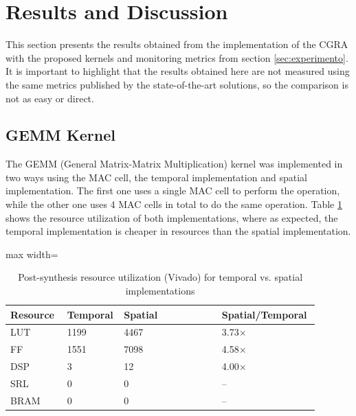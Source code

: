 \documentclass[conference]{IEEEtran}
\begin{document}
\section{Results and Discussion}

This section presents the results obtained from the implementation of the CGRA with the proposed kernels and monitoring metrics from section \ref{sec:experimento}. 
It is important to highlight that the results obtained here are not measured using the same metrics published by the state-of-the-art solutions, so the comparison is not as easy or direct. 




\subsection{GEMM Kernel}

The GEMM (General Matrix-Matrix Multiplication) kernel was implemented in two ways using the MAC cell, the temporal implementation and spatial implementation. 
The first one uses a single MAC cell to perform the operation, while the other one uses 4 MAC cells in total to do the same operation. 
Table \ref{tab:resource_util_GEMM} shows the resource utilization of both implementations, where as expected, the temporal implementation is cheaper in resources than the spatial implementation. 

\begin{table}[htbp]
\centering
\caption{Post-synthesis resource utilization (Vivado) for temporal vs. spatial implementations}
\label{tab:resource_util_GEMM}
\scriptsize
\begin{adjustbox}{max width=\columnwidth}
\begin{tabular}{@{}p{0.18\linewidth}p{0.18\linewidth}p{0.31\linewidth}p{0.31\linewidth}@{}}
\toprule
\textbf{Resource} & \textbf{Temporal} & \textbf{Spatial} & \textbf{Spatial/Temporal} \\
\midrule
LUT & 1199 & 4467 & 3.73$\times$ \\
FF & 1551 & 7098 & 4.58$\times$ \\
DSP & 3 & 12 & 4.00$\times$ \\
SRL & 0 & 0 & -- \\
BRAM & 0 & 0 & -- \\
\bottomrule
\end{tabular}
\end{adjustbox}
\end{table}
\end{document}
